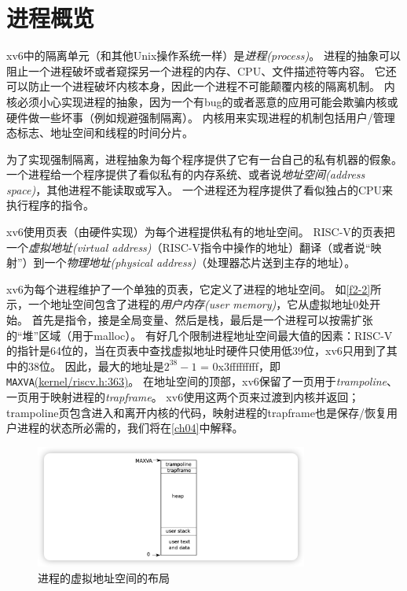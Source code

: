 \section{进程概览}
xv6中的隔离单元（和其他Unix操作系统一样）是\emph{进程(process)}。
进程的抽象可以阻止一个进程破坏或者窥探另一个进程的内存、CPU、文件描述符等内容。
它还可以防止一个进程破坏内核本身，因此一个进程不可能颠覆内核的隔离机制。
内核必须小心实现进程的抽象，因为一个有bug的或者恶意的应用可能会欺骗内核或硬件做一些坏事（例如规避强制隔离）。
内核用来实现进程的机制包括用户/管理态标志、地址空间和线程的时间分片。

为了实现强制隔离，进程抽象为每个程序提供了它有一台自己的私有机器的假象。
一个进程给一个程序提供了看似私有的内存系统、或者说\emph{地址空间(address space)}，其他进程不能读取或写入。
一个进程还为程序提供了看似独占的CPU来执行程序的指令。

xv6使用页表（由硬件实现）为每个进程提供私有的地址空间。
RISC-V的页表把一个\emph{虚拟地址(virtual address)}（RISC-V指令中操作的地址）翻译（或者说“映射”）到一个\emph{物理地址(physical address)}（处理器芯片送到主存的地址）。

xv6为每个进程维护了一个单独的页表，它定义了进程的地址空间。
如\autoref{f2-2}所示，一个地址空间包含了进程的\emph{用户内存(user memory)}，它从虚拟地址0处开始。
首先是指令，接是全局变量、然后是栈，最后是一个进程可以按需扩张的“堆”区域（用于malloc）。
有好几个限制进程地址空间最大值的因素：RISC-V的指针是64位的，当在页表中查找虚拟地址时硬件只使用低39位，xv6只用到了其中的38位。
因此，最大的地址是$2^{38} - 1$ = 0x3fffffffff，即\texttt{MAXVA}\href{https://github.com/mit-pdos/xv6-riscv/blob/riscv//kernel/riscv.h#L363}{(kernel/riscv.h:363)}。
在地址空间的顶部，xv6保留了一页用于\emph{trampoline}、一页用于映射进程的\emph{trapframe}。
xv6使用这两个页来过渡到内核并返回；trampoline页包含进入和离开内核的代码，映射进程的trapframe也是保存/恢复用户进程的状态所必需的，我们将在\autoref{ch04}中解释。

\begin{figure}[htbp]
    \centering
    \includegraphics[width=0.8\textwidth]{../imgs/f2-2.png}
    \caption{进程的虚拟地址空间的布局}
    \label{f2-2}
\end{figure}

